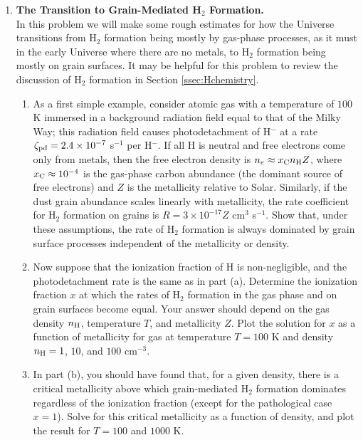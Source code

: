\begin{enumerate}
\item \textbf{The Transition to Grain-Mediated H$_2$ Formation.}\\
In this problem we will make some rough estimates for how the Universe transitions from H$_2$ formation being mostly by gas-phase processes, as it must in the early Universe where there are no metals, to H$_2$ formation being mostly on grain surfaces. It may be helpful for this problem to review the discussion of H$_2$ formation in Section \ref{ssec:Hchemistry}.
\begin{enumerate}
\item As a first simple example, consider atomic gas with a temperature of $100$ K immersed in a background radiation field equal to that of the Milky Way; this radiation field causes photodetachment of H$^-$ at a rate $\zeta_{\rm pd} = 2.4\times 10^{-7}$ s$^{-1}$ per H$^-$. If all H is neutral and free electrons come only from metals, then the free electron density is $n_e \approx x_{\rm C} n_{\rm H} Z$, where $x_{\rm C} \approx 10^{-4}$ is the gas-phase carbon abundance (the dominant source of free electrons) and $Z$ is the metallicity relative to Solar. Similarly, if the dust grain abundance scales linearly with metallicity, the rate coefficient for H$_2$ formation on grains is $R = 3\times 10^{-17} Z$ cm$^3$ s$^{-1}$. Show that, under these assumptions, the rate of H$_2$ formation is always dominated by grain surface processes independent of the metallicity or density.
\item Now suppose that the ionization fraction of H is non-negligible, and the photodetachment rate is the same as in part (a). Determine the ionization fraction $x$ at which the rates of H$_2$ formation in the gas phase and on grain surfaces become equal. Your answer should depend on the gas density $n_{\rm H}$, temperature $T$, and metallicity $Z$. Plot the solution for $x$ as a function of metallicity for gas at temperature $T=100$ K and density $n_{\rm H} = 1$, $10$, and $100$ cm$^{-3}$.
\item In part (b), you should have found that, for a given density, there is a critical metallicity above which grain-mediated H$_2$ formation dominates regardless of the ionization fraction (except for the pathological case $x=1$). Solve for this critical metallicity as a function of density, and plot the result for $T = 100$ and $1000$ K.
\end{enumerate}


\end{enumerate}
